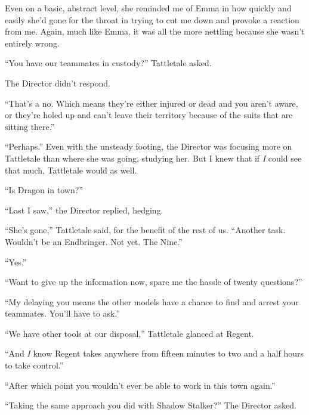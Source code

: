 Even on a basic, abstract level, she reminded me of Emma in how quickly and easily she'd gone for the throat in trying to cut me down and provoke a reaction from me.  Again, much like Emma, it was all the more nettling because she wasn't entirely wrong.



``You have our teammates in custody?'' Tattletale asked.



The Director didn't respond.



``That's a no.  Which means they're either injured or dead and you aren't aware, or they're holed up and can't leave their territory because of the suits that are sitting there.''



``Perhaps.''  Even with the unsteady footing, the Director was focusing more on Tattletale than where she was going, studying her.  But I knew that if \emph{I} could see that much, Tattletale would as well.



``Is Dragon in town?''



``Last I saw,'' the Director replied, hedging.



``She's gone,'' Tattletale said, for the benefit of the rest of us.  ``Another task.  Wouldn't be an Endbringer.  Not yet.  The Nine.''



``Yes.''



``Want to give up the information now, spare me the hassle of twenty questions?''



``My delaying you means the other models have a chance to find and arrest your teammates.  You'll have to ask.''



``We have other tools at our disposal,'' Tattletale glanced at Regent.



``And \emph{I} know Regent takes anywhere from fifteen minutes to two and a half hours to take control.''



``After which point you wouldn't ever be able to work in this town again.''



``Taking the same approach you did with Shadow Stalker?''  The Director asked.



